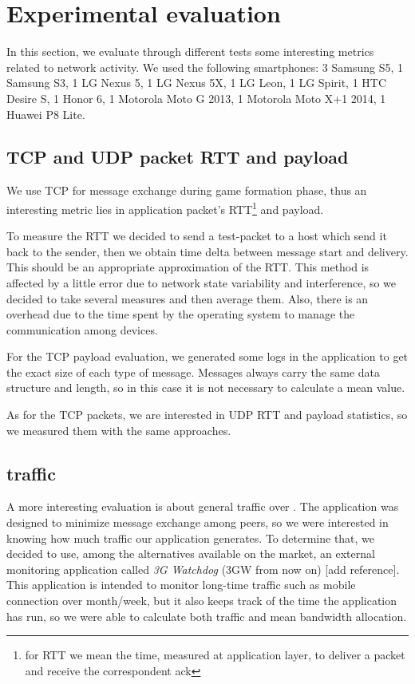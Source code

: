 \section{Experimental evaluation}

In this section, we evaluate through different tests some interesting metrics
related to network activity. We used the following smartphones: 3 Samsung S5,
1 Samsung S3, 1 LG Nexus 5, 1 LG Nexus 5X, 1 LG Leon, 1 LG Spirit, 1 HTC Desire
S, 1 Honor 6, 1 Motorola Moto G 2013, 1 Motorola Moto X+1 2014, 1 Huawei P8
Lite.

\subsection{TCP and UDP packet RTT and payload}
We use TCP for message exchange during game formation phase, thus an interesting metric lies in application packet's RTT\footnote{for RTT we mean the time, measured at application layer, to deliver a packet and receive the correspondent ack} and payload.
 
To measure the RTT we decided to send a test-packet to a host which send it
back to the sender, then we obtain time delta between message start and
delivery. This should be an appropriate approximation of the RTT. This method
is affected by a little error due to network state variability and
interference, so we decided to take several measures and then average them.
Also, there is an overhead due to the time spent by the operating system to
manage the communication among devices.

For the TCP payload evaluation, we generated some logs in the application to get the exact size of each type of message. Messages always carry the same data structure and length, so in this case it is not necessary to calculate a mean value.

As for the TCP packets, we are interested in UDP RTT and payload statistics, so we measured them with the same approaches.

\subsection{\wifi{} traffic}

A more interesting evaluation is about general traffic over \wifi. The application was designed to minimize message exchange among peers, so we were interested in knowing how much traffic our application generates. To determine that, we decided to use, among the alternatives available on the market, an external monitoring application called \textit{3G Watchdog} (3GW from now on) [add reference]. This application is intended to monitor long-time traffic such as mobile connection over month/week, but it also keeps track of the time the application has run, so we were able to calculate both traffic and mean bandwidth allocation.

